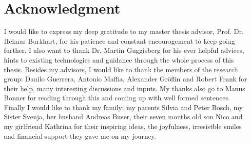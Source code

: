 \chapter*{Acknowledgment}
I would like to express my deep gratitude to my master thesis advisor, Prof. Dr. Helmar Burkhart, for his patience and constant encouragement to keep going further.
I also want to thank Dr. Martin Guggisberg for his ever helpful advices, hints to existing technologies and guidance through the whole process of this thesis.
Besides my advisors, I would like to thank the members of the research group: Danilo Guerrera,
Antonio Maffia, Alexander Gr\"oflin and Robert Frank for their help, many interesting discussions and inputs.
My thanks also go to Manus Bonner for reading through this and coming up with well formed sentences.
Finally I would like to thank my family; my parents Silvia and Peter Bosch, my Sister Svenja, her husband Andreas Buser, their seven months old son Nico and my girlfriend Kathrina for their inspiring ideas, the joyfulness, irresistble smiles and financial support they gave me on my journey.